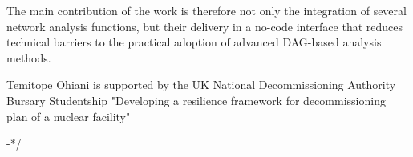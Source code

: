 \documentclass[twocolumn]{rps-esrel2026}
\begin{document}
The main contribution of the work is therefore not only the integration of several network analysis functions, but their delivery in a no-code interface that reduces technical barriers to the practical adoption of advanced DAG-based analysis methods.

\begin{acknowledgement}
Temitope Ohiani is supported by the UK National Decommissioning Authority Bursary Studentship "Developing a resilience framework for decommissioning plan of a nuclear facility"


\end{acknowledgement}
-*/

\end{document}
